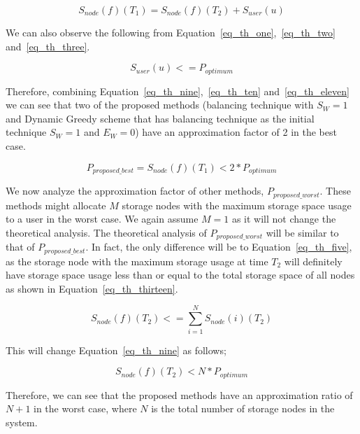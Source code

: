 \begin{equation}
S_{node}(f)(T_1) = S_{node}(f)(T_2) + S_{user}(u)
\label{eq_th_ten}
\end{equation}
\hfill

We can also observe the following from Equation~\eqref{eq_th_one},~\eqref{eq_th_two} and~\eqref{eq_th_three}.

\begin{equation}
S_{user}(u) <= P_{optimum}
\label{eq_th_eleven}
\end{equation}
\hfill

Therefore, combining Equation~\eqref{eq_th_nine},~\eqref{eq_th_ten} and~\eqref{eq_th_eleven}
we can see that two of the proposed methods (balancing technique with $S_W = 1$ and
Dynamic Greedy scheme that has balancing technique as the initial technique $S_W = 1$ and
$E_W = 0$) have an approximation factor of 2 in the best case.

\begin{equation}
P_{proposed\_best} = S_{node}(f)(T_1) < 2 * P_{optimum}
\label{eq_th_twelve}
\end{equation}
\hfill

We now analyze the approximation factor of other methods, $P_{proposed\_worst}$. These methods
might allocate $M$ storage nodes with the maximum storage space usage to a user in the worst case. We again
assume $ M = 1 $ as it will not change the theoretical analysis. The theoretical analysis of $P_{proposed\_worst}$
will be similar to that of $P_{proposed\_best}$. In fact, the only difference will be to Equation~\eqref{eq_th_five},
as the storage node with the maximum storage usage at time $T_2$ will definitely have storage space usage less
than or equal to the total storage space of all nodes as shown in Equation~\eqref{eq_th_thirteen}.

\begin{equation}
S_{node}(f)(T_2) <= \sum\limits_{i=1}^{N}S_{node}(i)(T_2)
\label{eq_th_thirteen}
\end{equation}
\hfill

This will change Equation~\eqref{eq_th_nine} as follows;

\begin{equation}
S_{node}(f)(T_2) < N * P_{optimum}
\label{eq_th_fourteen}
\end{equation}
\hfill

Therefore, we can see that the proposed methods have an approximation ratio of $N + 1$ in the worst case, where
$N$ is the total number of storage nodes in the system.

